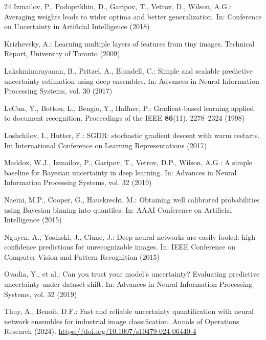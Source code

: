 \documentclass[11pt,a4paper]{article}
\begin{document}
\begin{thebibliography}{24}
 Izmailov, P., Podoprikhin,
D., Garipov, T., Vetrov, D., Wilson, A.G.: Averaging weights leads to wider
optima and better generalization. In: Conference on Uncertainty in
Artificial Intelligence (2018)

 Krizhevsky, A.: Learning
multiple layers of features from tiny images. Technical Report, University
of Toronto (2009)

Lakshminarayanan, B., Pritzel, A., Blundell, C.: Simple and scalable
predictive uncertainty estimation using deep ensembles. In: Advances in
Neural Information Processing Systems, vol. 30 (2017)

 LeCun, Y., Bottou, L., Bengio, Y.,
Haffner, P.: Gradient-based learning applied to document recognition.
Proceedings of the IEEE \textbf{86}(11), 2278--2324 (1998)

 Loshchilov, I.,
Hutter, F.: SGDR: stochastic gradient descent with warm restarts. In:
International Conference on Learning Representations (2017)

 Maddox, W.J., Izmailov, P.,
Garipov, T., Vetrov, D.P., Wilson, A.G.: A simple baseline for Bayesian
uncertainty in deep learning. In: Advances in Neural Information Processing
Systems, vol. 32 (2019)

 Naeini, M.P., Cooper, G.,
Hauskrecht, M.: Obtaining well calibrated probabilities using Bayesian
binning into quantiles. In: AAAI Conference on Artificial Intelligence
(2015)

 Nguyen, A., Yosinski, J., Clune,
J.: Deep neural networks are easily fooled: high confidence predictions
for unrecognizable images. In: IEEE Conference on Computer Vision and
Pattern Recognition (2015)

 Ovadia, Y., et al.: Can you
trust your model's uncertainty? Evaluating predictive uncertainty under
dataset shift. In: Advances in Neural Information Processing Systems,
vol. 32 (2019)

 Thuy, A., Benoit, D.F.: Fast and
reliable uncertainty quantification with neural network ensembles for
industrial image classification. Annals of Operations Research (2024).
\url{https://doi.org/10.1007/s10479-024-06440-4}


\end{thebibliography}
\end{document}
